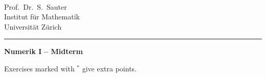 \documentclass[11pt,a4paper,english,hyperref]{article}
\theoremstyle{break}   %
\begin{document}
\parbox{0ex}{    }   \\
\parbox{25ex}{
  Prof.~Dr.~S.~Sauter\\
  Institut für Mathematik\\
  Universität Zürich
}
% 
\rule[0cm]{0.cm}{.01cm}                  
\hfill  \parbox{0.6\textwidth}{
  {\sf\LARGE\bfseries Numerik I}
  {\sf\Large\bfseries \;\;--\;\; Midterm}\\[1.5ex]
}
\vspace{5ex}




% 
% 
Exercises marked with $^*$ give extra points.
\end{document}
